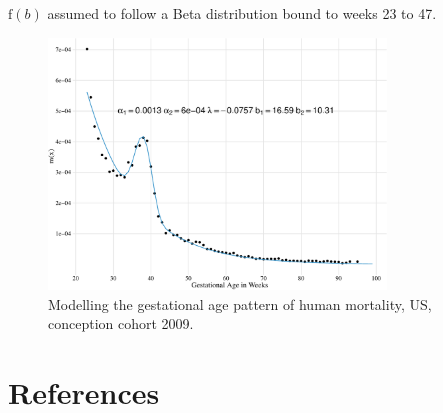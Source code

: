\documentclass{beamer}
\begin{document}
\begin{frame}
\frametitle{\insertsection}

$\text{f}(b)$ assumed to follow a Beta distribution bound to weeks 23 to 47.

\begin{figure}[htb!]
\includegraphics[width = 0.8\textwidth]{./fig/fimort_mx_model2.pdf} \\
Modelling the gestational age pattern of human mortality, US, conception cohort 2009.
\end{figure}

\end{frame}

\section{References} %

\begin{frame}
\frametitle{\insertsection}

  \printbibliography

\end{frame}
\end{document}
